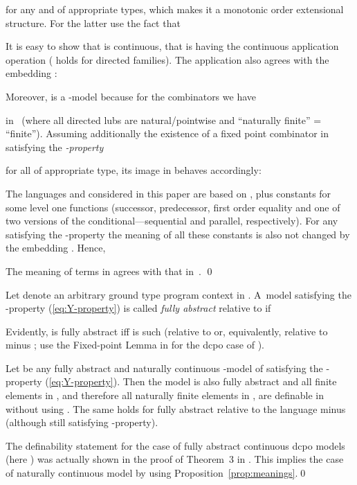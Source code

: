 \documentclass[fleqn]{LMCS}
\theoremstyle{plain}\newtheorem{satz}[thm]{Satz}
\theoremstyle{plain}\newtheorem{hyp}[thm]{Hypothesis}
\theoremstyle{plain}\newtheorem{hyps}[thm]{Hypotheses}
\theoremstyle{definition}\newtheorem{note}[thm]{Note}
\newcommand{\?}{\mbox{?}}
\begin{document}
for any  and  of appropriate types, 
which makes it a monotonic order extensional structure. 
For the latter use the fact that 

It is easy to show that  is continuous, that is having the continuous 
application operation  
( holds 
for directed families). 
The application also agrees with the embedding : 

Moreover,  is a -model because for the combinators 
 we have 
 
in~ (where all directed lubs are natural/pointwise and 
``naturally finite'' = ``finite''). 
Assuming additionally the existence of 
a fixed point combinator in  satisfying the \emph{-property}

for all  of appropriate type, its 
image in  behaves accordingly: 



The languages  and  \cite{Plotkin77,Longley-Plotkin} 
considered in this paper are based on , 
plus constants for some level one functions 
(successor, predecessor, first order equality and one of two versions 
of the conditional---sequential and parallel, respectively).
For any  satisfying the -property the meaning of all these constants 
is also not changed by the embedding . 
Hence, 
\begin{prop}\label{prop:meanings}
The meaning of\/  terms in  
agrees with that in~.
\qed 
\end{prop}
\begin{defi}\label{def:full-abstract}Let  denote an arbitrary ground type program context in . 
A~model  satisfying the -property (\ref{eq:Y-property}) 
is called \emph{fully abstract} relative to  if  

\end{defi}
\noindent
Evidently,  is fully abstract iff  is such 
(relative to  or, equivalently, relative to  minus ; 
use the Fixed-point Lemma in \cite{Milner77} for the dcpo case of ). 

\begin{prop}
Let  be any fully abstract and 
naturally continuous -model of\/  
satisfying the -property (\ref{eq:Y-property}). 
Then the model  is also fully abstract and 
all finite elements in , and therefore all naturally finite elements in , 
are definable in\/  without using\/ . 
The same holds for  fully abstract relative to 
the language  minus\/  
(although still satisfying -property). 
\end{prop}
\proof  
The definability statement for the case of fully abstract continuous dcpo models 
(here ) was actually shown in the proof of Theorem~3 in  \cite{Milner77}. 
This implies the case of naturally continuous model  by using 
Proposition~\ref{prop:meanings}.\qed
\end{document}
